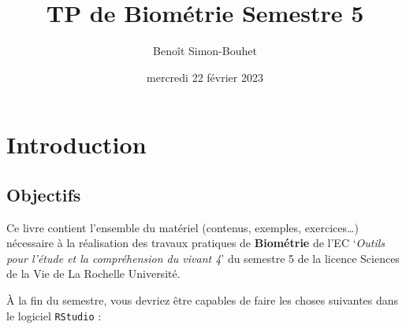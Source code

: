 \documentclass[
  a4paper,
  DIV=11,
  numbers=noendperiod,
  oneside]{scrreprt}
\title{TP de Biométrie Semestre 5}
\author{Benoît Simon-Bouhet}
\date{mercredi 22 février 2023}
\renewcommand*\contentsname{Table des matières}
\newcommand\contentsname{Table des matières}
\begin{document}
\maketitle
\ifdefined\Shaded\renewenvironment{Shaded}{\begin{tcolorbox}[borderline west={3pt}{0pt}{shadecolor}, boxrule=0pt, breakable, sharp corners, frame hidden, enhanced, interior hidden]}{\end{tcolorbox}}\fi

\renewcommand*\contentsname{Table des matières}
{
\hypersetup{linkcolor=}
\setcounter{tocdepth}{2}
\tableofcontents
}

\hypertarget{introduction}{%
\chapter*{Introduction}\label{introduction}}

\hypertarget{objectifs}{%
\section*{Objectifs}\label{objectifs}}

Ce livre contient l'ensemble du matériel (contenus, exemples,
exercices\ldots) nécessaire à la réalisation des travaux pratiques de
\textbf{Biométrie} de l'EC `\emph{Outils pour l'étude et la
compréhension du vivant 4}' du semestre 5 de la licence Sciences de la
Vie de La Rochelle Université.

À la fin du semestre, vous devriez être capables de faire les choses
suivantes dans le logiciel \texttt{RStudio} :
\end{document}
